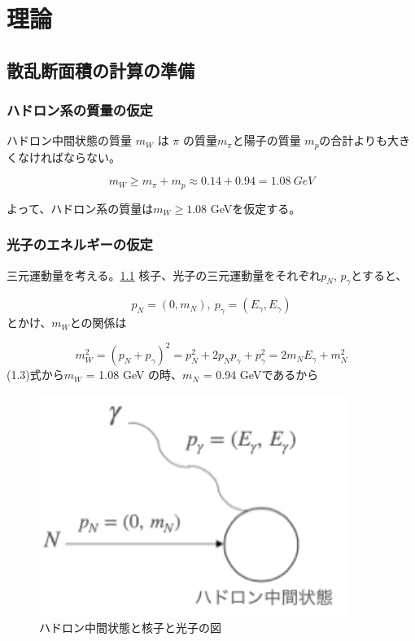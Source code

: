 \chapter{理論} \label{cha:theory}
\section{散乱断面積の計算の準備}
\subsection{ハドロン系の質量の仮定}
ハドロン中間状態の質量 $m_W$ は $\pi$ の質量$m_\pi$と陽子の質量 $m_p$の合計よりも大きくなければならない。

\begin{equation}
    m_W \geq m_\pi + m_p \approx 0.14 + 0.94 = 1.08 \ GeV
\end{equation}

よって、ハドロン系の質量は$m_W \geq 1.08$ GeVを仮定する。


\subsection{光子のエネルギーの仮定}
三元運動量を考える。\ref{fig:test2}
核子、光子の三元運動量をそれぞれ$p_N$, $p_\gamma$とすると、

\begin{equation}
    p_N = (0, m_N),\  p_\gamma = (E_\gamma, E_\gamma)
\end{equation}
とかけ、$m_W$との関係は

\begin{equation}
    m_W^2 = (p_N + p_\gamma)^2 = p_N^2 + 2p_N p_\gamma + p_\gamma^2
          = 2m_N E_\gamma + m_N^2 
\end{equation}
(1.3)式から$m_W$ = 1.08 GeV の時、$m_N$ = 0.94 GeVであるから

\begin{figure}[H]
	\centering
	\includegraphics[width=10cm]{img/diagram_momentum.png}
	\caption{ハドロン中間状態と核子と光子の図}
	\label{fig:test2}
\end{figure}

